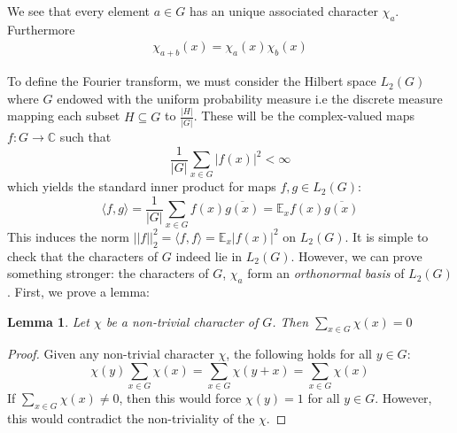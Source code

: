 \documentclass{amsart}
\newtheorem{lemma}[theorem]{Lemma}
\theoremstyle{definition}
\theoremstyle{remark}
\numberwithin{equation}{section}
\theoremstyle{remark}
\begin{document}
\noindent We see that every element $a \in G$ has an unique associated character $\chi_a$. Furthermore
%
\begin{gather} \label{chargroup}
  \chi_{a+b}(x)  = \chi_{a}(x)\chi_{b}(x)
\end{gather} \newline

To define the Fourier transform, we must consider the Hilbert space $L_2(G)$ where $G$ endowed with the uniform probability measure i.e the discrete measure mapping each subset $H \subseteq G$ to $\frac{|H|}{|G|}$. These will be the complex-valued maps $f: G \rightarrow \mathbb{C}$ such that
\begin{equation}
  \frac{1}{|G|}\sum_{x \in G} |f(x)|^2 < \infty
\end{equation}
%
\noindent which yields the standard inner product for maps $f,g \in L_2(G)$: \newline
%
\begin{equation}
  \langle f,g \rangle = \frac{1}{|G|}\sum_{x\in G} f(x)\overline{g(x)}= \mathbb{E}_x f(x)\overline{g(x)}
\end{equation}
%
This induces the norm $||f||_2^2 = \langle f, f \rangle = \mathbb{E}_x |f(x)|^2$ on $L_2(G)$. It is simple to check that the characters of $G$ indeed lie in $L_2(G)$. However, we can prove something stronger: the characters of $G$, $\chi_a$ form an \emph{orthonormal basis} of $L_2(G)$.
%
First, we prove a lemma:
\begin{lemma} \label{totalsum}
  Let $\chi$ be a non-trivial character of $G$. Then $\sum_{x \in G} \chi(x) = 0$
\end{lemma}
%
\begin{proof}
  Given any non-trivial character $\chi$, the following holds for all $y \in G$: \newline
    \[ \chi(y)\sum_{x \in G} \chi(x) = \sum_{x \in G} \chi(y+x) = \sum_{x \in G} \chi(x) \]\newline
    If $\sum_{x \in G} \chi(x) \neq 0$, then this would force $\chi(y) = 1$ for all $y \in G$. However, this would contradict the non-triviality of the $\chi$.
\end{proof}
\end{document}
